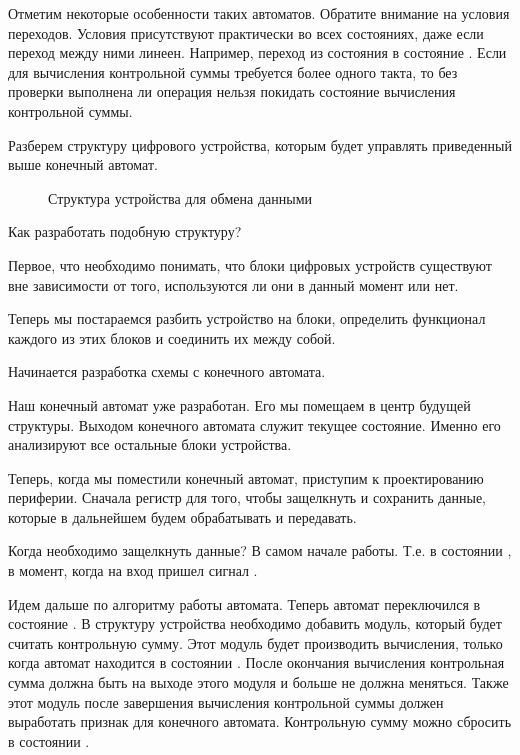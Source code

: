 \par{Отметим некоторые особенности таких автоматов. Обратите внимание на условия переходов. Условия присутствуют практически во всех состояниях, даже если переход между ними линеен. Например, переход из состояния  в состояние . Если для вычисления контрольной суммы требуется более одного такта, то без проверки выполнена ли операция нельзя покидать состояние вычисления контрольной суммы.}

\par{Разберем структуру цифрового устройства, которым будет управлять приведенный выше конечный автомат.}

\begin{figure}[H]
  \centering
  \def\svgwidth{\columnwidth}
  
  \caption{Структура устройства для обмена данными}
\end{figure}

\par{Как разработать подобную структуру?}

\par{Первое, что необходимо понимать, что блоки цифровых устройств существуют вне зависимости от того, используются ли они в данный момент или нет.}

\par{Теперь мы постараемся разбить устройство на блоки, определить функционал каждого из этих блоков и соединить их между собой.}

\par{Начинается разработка схемы с конечного автомата.}

\par{Наш конечный автомат уже разработан. Его мы помещаем в центр будущей структуры. Выходом конечного автомата служит текущее состояние. Именно его анализируют все остальные блоки устройства.}

\par{Теперь, когда мы поместили конечный автомат, приступим к проектированию периферии. Сначала регистр для того, чтобы защелкнуть и сохранить данные, которые в дальнейшем будем обрабатывать и передавать.}

\par{Когда необходимо защелкнуть данные? В самом начале работы. Т.е. в состоянии , в момент, когда на вход пришел сигнал .}

\par{Идем дальше по алгоритму работы автомата. Теперь автомат переключился в состояние . В структуру устройства необходимо добавить модуль, который будет считать контрольную сумму. Этот модуль будет производить вычисления, только когда автомат находится в состоянии . После окончания вычисления контрольная сумма должна быть на выходе этого модуля и больше не должна меняться. Также этот модуль после завершения вычисления контрольной суммы должен выработать признак  для конечного автомата. Контрольную сумму можно сбросить в состоянии .}

